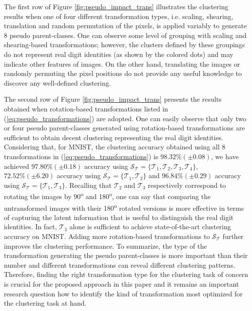 \documentclass{article} \usepackage{iclr2018_conference,times}
\begin{document}
The first row of Figure \ref{fig:pseudo_impact_trans} illustrates the clustering results when one of four different transformation types, i.e. scaling, shearing, translation and random permutation of the pixels, is applied variably to generate 8 pseudo parent-classes. One can observe some level of grouping with scaling and shearing-based transformations; however, the clusters defined by these groupings do not represent real digit identities (as shown by the colored dots) and may indicate other features of images. On the other hand, translating the images or randomly permuting the pixel positions do not provide any useful knowledge to discover any well-defined clustering. 


The second row of Figure \ref{fig:pseudo_impact_trans} presents the results obtained when rotation-based transformations listed in (\ref{eq:pseudo_transformations}) are adopted. One can easily observe that only two or four pseudo parent-classes generated using rotation-based transformations are sufficient to obtain decent clustering representing the real digit identities. Considering that, for MNIST, the clustering accuracy obtained using all 8 transformations in (\ref{eq:pseudo_transformations}) is $98.32\%(\pm 0.08)$, we have achieved $97.80\%(\pm 0.18)$ accuracy using $\mathcal{S}_\mathcal{T}=\{\mathcal{T}_1,\mathcal{T}_2,\mathcal{T}_3,\mathcal{T}_4\}$, $72.52\%(\pm 6.20)$ accuracy using $\mathcal{S}_\mathcal{T}=\{\mathcal{T}_1,\mathcal{T}_2\}$ and $96.84\%(\pm 0.29)$ accuracy using $\mathcal{S}_\mathcal{T}=\{\mathcal{T}_1,\mathcal{T}_3\}$. Recalling that $\mathcal{T}_2$ and $\mathcal{T}_3$ respectively correspond to rotating the images by 90\textsuperscript{o} and 180\textsuperscript{o}, one can say that comparing the untransformed images with their 180\textsuperscript{o} rotated versions is more effective in terms of capturing the latent information that is useful to distinguish the real digit identities. In fact, $\mathcal{T}_3$ alone is sufficient to achieve state-of-the-art clustering accuracy on MNIST. Adding more rotation-based transformations to $\mathcal{S}_\mathcal{T}$ further improves the clustering performance. To summarize, the type of the transformation generating the pseudo parent-classes is more important than their number and different transformations can reveal different clustering patterns. Therefore, finding the right transformation type for the clustering task of concern is crucial for the proposed approach in this paper and it remains an important research question how to identify the kind of transformation most optimized for the clustering task at hand. 
\end{document}
